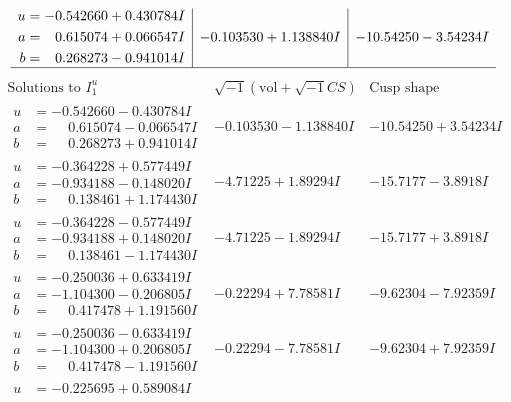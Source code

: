 \documentclass[1p]{elsarticle_modified}
\theoremstyle{definition}
\newcommand{\I}{\sqrt{-1}}
\begin{document}
$$\begin{array}{c|c|c}
\begin{aligned}
u &= -0.542660 + 0.430784 I \\
a &= \phantom{-}0.615074 + 0.066547 I \\
b &= \phantom{-}0.268273 - 0.941014 I\end{aligned}
 & -0.103530 + 1.138840 I & -10.54250 - 3.54234 I\\
 \hline 
 \end{array}$$\newpage$$\begin{array}{c|c|c}  
\text{Solutions to }I^u_{1}& \I (\text{vol} + \sqrt{-1}CS) & \text{Cusp shape}\\
 \hline 
\begin{aligned}
u &= -0.542660 - 0.430784 I \\
a &= \phantom{-}0.615074 - 0.066547 I \\
b &= \phantom{-}0.268273 + 0.941014 I\end{aligned}
 & -0.103530 - 1.138840 I & -10.54250 + 3.54234 I \\ \hline\begin{aligned}
u &= -0.364228 + 0.577449 I \\
a &= -0.934188 - 0.148020 I \\
b &= \phantom{-}0.138461 + 1.174430 I\end{aligned}
 & -4.71225 + 1.89294 I & -15.7177 - 3.8918 I \\ \hline\begin{aligned}
u &= -0.364228 - 0.577449 I \\
a &= -0.934188 + 0.148020 I \\
b &= \phantom{-}0.138461 - 1.174430 I\end{aligned}
 & -4.71225 - 1.89294 I & -15.7177 + 3.8918 I \\ \hline\begin{aligned}
u &= -0.250036 + 0.633419 I \\
a &= -1.104300 - 0.206805 I \\
b &= \phantom{-}0.417478 + 1.191560 I\end{aligned}
 & -0.22294 + 7.78581 I & -9.62304 - 7.92359 I \\ \hline\begin{aligned}
u &= -0.250036 - 0.633419 I \\
a &= -1.104300 + 0.206805 I \\
b &= \phantom{-}0.417478 - 1.191560 I\end{aligned}
 & -0.22294 - 7.78581 I & -9.62304 + 7.92359 I \\ \hline\begin{aligned}
u &= -0.225695 + 0.589084 I \\

\end{aligned}
\end{array}$$
\end{document}
